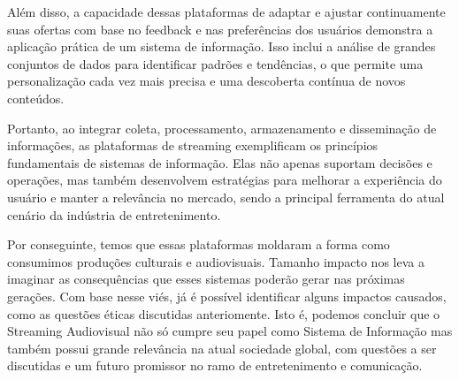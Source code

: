 \documentclass[conference]{IEEEtran}
\begin{document}
Além disso, a capacidade dessas plataformas de adaptar e ajustar continuamente suas ofertas com base no feedback e nas preferências dos usuários demonstra a aplicação prática de um sistema de informação. Isso inclui a análise de grandes conjuntos de dados para identificar padrões e tendências, o que permite uma personalização cada vez mais precisa e uma descoberta contínua de novos conteúdos.

Portanto, ao integrar coleta, processamento, armazenamento e disseminação de informações, as plataformas de streaming exemplificam os princípios fundamentais de sistemas de informação. Elas não apenas suportam decisões e operações, mas também desenvolvem estratégias para melhorar a experiência do usuário e manter a relevância no mercado, sendo a principal ferramenta do atual cenário da indústria de entretenimento.

Por conseguinte, temos que essas plataformas moldaram a forma como consumimos produções culturais e audiovisuais. Tamanho impacto nos leva a imaginar as consequências que esses sistemas poderão gerar nas próximas gerações. Com base nesse viés, já é possível identificar alguns impactos causados, como as questões éticas discutidas anteriomente. Isto é, podemos concluir que o Streaming Audiovisual não só cumpre seu papel como Sistema de Informação mas também possui grande relevância na atual sociedade global, com questões a ser discutidas e um futuro promissor no ramo de entretenimento e comunicação.



\end{document}

